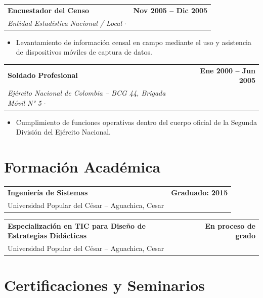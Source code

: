 \documentclass[10pt, letterpaper]{article}
\makeatletter
\newcommand{\cventry}[5]{%
  \noindent
  \begin{tabularx}{\linewidth}{@{}X r@{}}
    {\bfseries\color{primary} #1} & {\small\color{medgray}\bfseries #2} \\
    {\small\color{accent}\itshape #3} \quad $\cdot$ \quad {\small\color{darkgray} #4} & \\
  \end{tabularx}
  \vspace{-2pt}
  #5
  \vspace{4pt}
}
\makeatother
\begin{document}
\cventry
  {Encuestador del Censo}
  {Nov 2005 -- Dic 2005}
  {Entidad Estadística Nacional / Local}
  {Gamarra, Cesar -- Presencial}
  {
    \begin{itemize}
      \item Levantamiento de información censal en campo mediante el uso y asistencia de dispositivos móviles de captura de datos.
    \end{itemize}
  }

\cventry
  {Soldado Profesional}
  {Ene 2000 -- Jun 2005}
  {Ejército Nacional de Colombia -- BCG 44, Brigada Móvil N° 5}
  {Bucaramanga, Santander -- Presencial}
  {
    \begin{itemize}
      \item Cumplimiento de funciones operativas dentro del cuerpo oficial de la Segunda División del Ejército Nacional.
    \end{itemize}
  }

\section*{Formación Académica}
\vspace{-2pt}

\noindent
\begin{tabularx}{\linewidth}{@{}X r@{}}
  {\bfseries\color{primary} Ingeniería de Sistemas} & {\small\color{medgray}\bfseries Graduado: 2015}\\
  {\small\color{darkgray} Universidad Popular del César -- Aguachica, Cesar} & \\
\end{tabularx}

\vspace{4pt}

\noindent
\begin{tabularx}{\linewidth}{@{}X r@{}}
  {\bfseries\color{primary} Especialización en TIC para Diseño de Estrategias Didácticas} & {\small\color{medgray}\bfseries En proceso de grado} \\
  {\small\color{darkgray} Universidad Popular del César -- Aguachica, Cesar} & \\
\end{tabularx}

\section*{Certificaciones y Seminarios}
\vspace{-2pt}
\end{document}
